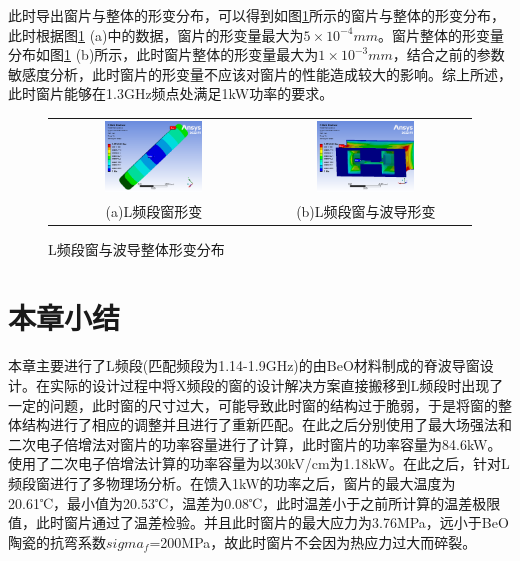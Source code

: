 \documentclass[master]{thesis-uestc}
\begin{document}
此时导出窗片与整体的形变分布，可以得到如图\ref{fig:L频段窗与整体形变分布}所示的窗片与整体的形变分布，此时根据图\ref{fig:L频段窗与整体形变分布} (a)中的数据，窗片的形变量最大为\(5 \times 10 ^{-4}mm\)。窗片整体的形变量分布如图\ref{fig:L频段窗与整体形变分布} (b)所示，此时窗片整体的形变量最大为\(1 \times 10 ^{-3}mm\)，结合之前的参数敏感度分析，此时窗片的形变量不应该对窗片的性能造成较大的影响。综上所述，此时窗片能够在1.3GHz频点处满足1kW功率的要求。
\begin{figure}[!htb]
    \small
    \centering
    \begin{tabular}{@{\ }c@{\ }c}
        \includegraphics[width=0.49\textwidth]{pic/chapter4/L频段窗形变.png} & 
        \hspace{5pt}
        \includegraphics[width=0.49\textwidth]{pic/chapter4/L频段整体形变.png}     \\
        \mbox{\small (a)L频段窗形变}                                                                               & 
        \mbox{\small (b)L频段窗与波导形变}                                                                                  \\
    \end{tabular}
    \caption{L频段窗与波导整体形变分布}
    \label{fig:L频段窗与整体形变分布}
\end{figure}


\section{本章小结}
本章主要进行了L频段(匹配频段为1.14-1.9GHz)的由BeO材料制成的脊波导窗设计。在实际的设计过程中将X频段的窗的设计解决方案直接搬移到L频段时出现了一定的问题，此时窗的尺寸过大，可能导致此时窗的结构过于脆弱，于是将窗的整体结构进行了相应的调整并且进行了重新匹配。在此之后分别使用了最大场强法和二次电子倍增法对窗片的功率容量进行了计算，此时窗片的功率容量为84.6kW。使用了二次电子倍增法计算的功率容量为以30kV/cm为1.18kW。在此之后，针对L频段窗进行了多物理场分析。在馈入1kW的功率之后，窗片的最大温度为20.61℃，最小值为20.53℃，温差为0.08℃，此时温差小于之前所计算的温差极限值，此时窗片通过了温差检验。并且此时窗片的最大应力为3.76MPa，远小于BeO陶瓷的抗弯系数\(sigma_f\)=200MPa，故此时窗片不会因为热应力过大而碎裂。
\end{document}
